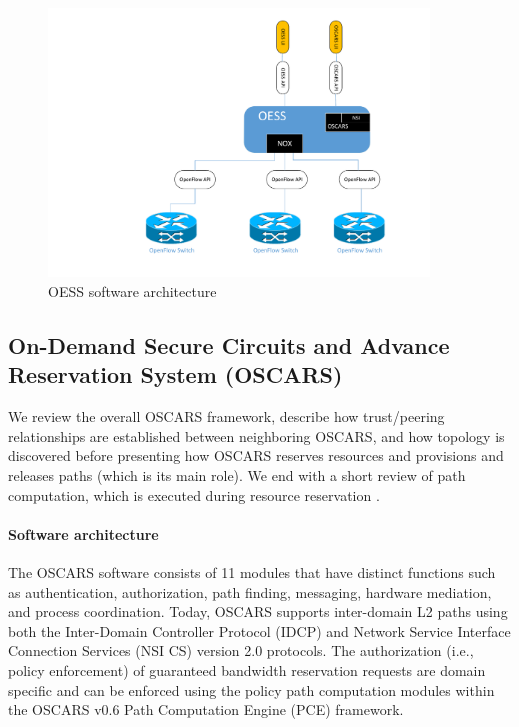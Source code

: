 \begin{figure}[htbp!]
\centering \includegraphics[width=0.9\textwidth]{figures/ControlPlane.pdf}
\caption{OESS software architecture}
\label{fig:ControlPlane}
\end{figure}

\subsection{On-Demand Secure Circuits and Advance Reservation System (OSCARS)}
We review the overall OSCARS framework, describe how trust/peering relationships are established between neighboring OSCARS, and how topology is discovered before presenting how OSCARS reserves resources and provisions and releases paths (which is its main role). We end with a short review of path computation, which is executed during resource reservation \cite{OSCARS}.

\paragraph{Software architecture}
The OSCARS software consists of 11 modules that have distinct functions such as authentication, authorization, path finding, messaging, hardware mediation, and process coordination. Today, OSCARS supports inter-domain L2 paths using both the Inter-Domain Controller Protocol (IDCP) \cite{IDCP} and Network Service Interface Connection Services (NSI CS) version 2.0 \cite{NSI} protocols. The authorization (i.e., policy enforcement) of guaranteed bandwidth reservation requests are domain specific and can be enforced using the policy path computation modules within the OSCARS v0.6 Path Computation Engine (PCE) framework.

